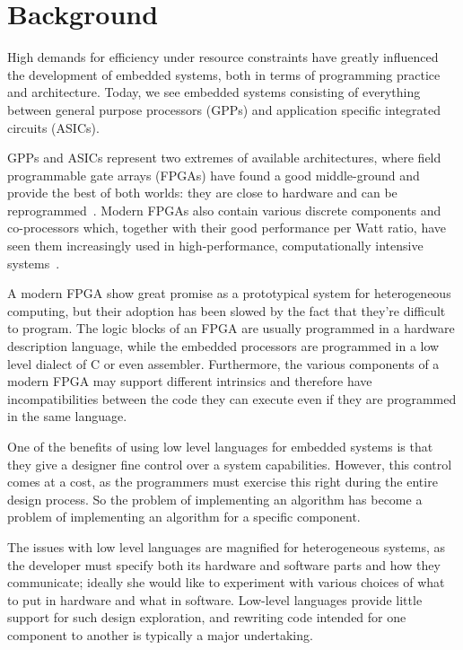 \documentclass[../paper.tex]{subfiles}
\begin{document}
\chapter{Background}
\label{background}

High demands for efficiency under resource constraints have greatly influenced the development of embedded systems, both in terms of programming practice and architecture. Today, we see embedded systems consisting of everything between general purpose processors (GPPs) and application specific integrated circuits (ASICs).

GPPs and ASICs represent two extremes of available architectures, where field programmable gate arrays (FPGAs) have found a good middle-ground and provide the best of both worlds: they are close to hardware and can be reprogrammed~\cite{bacon2013}. Modern FPGAs also contain various discrete components and co-processors which, together with their good performance per Watt ratio, have seen them increasingly used in high-performance, computationally intensive systems~\cite{mcmillan2014}.

A modern FPGA show great promise as a prototypical system for heterogeneous computing, but their adoption has been slowed by the fact that they're difficult to program. The logic blocks of an FPGA are usually programmed in a hardware description language, while the embedded processors are programmed in a low level dialect of C or even assembler. Furthermore, the various components of a modern FPGA may support different intrinsics and therefore have incompatibilities between the code they can execute even if they are programmed in the same language.

One of the benefits of using low level languages for embedded systems is that they give a designer fine control over a system capabilities. However, this control comes at a cost, as the programmers must exercise this right during the entire design process. So the problem of implementing an algorithm has become a problem of implementing an algorithm for a specific component.

The issues with low level languages are magnified for heterogeneous systems, as the developer must specify both its hardware and software parts and how they communicate; ideally she would like to experiment with various choices of what to put in hardware and what in software. Low-level languages provide little support for such design exploration, and rewriting code intended for one component to another is typically a major undertaking.
\end{document}
